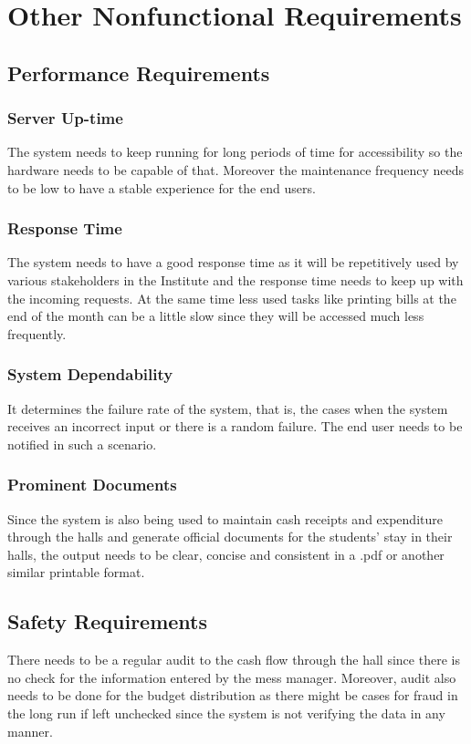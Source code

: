 \documentclass{scrreprt}
\begin{document}
\chapter{Other Nonfunctional Requirements}

\section{Performance Requirements}
\subsection{Server Up-time}
The system needs to keep running for long periods of time for accessibility so the hardware needs to be capable of that. Moreover the maintenance frequency needs to be low to have a stable experience for the end users.\subsection{Response Time}
The system needs to have a good response time as it will be repetitively used by various stakeholders in the Institute and the response time needs to keep up with the incoming requests. At the same time less used tasks like printing bills at the end of the month can be a little slow since they will be accessed much less frequently.
\subsection{System Dependability}
It determines the failure rate of the system, that is, the cases when the system receives an incorrect input or there is a random failure. The end user needs to be notified in such a scenario.
\subsection{Prominent Documents}
Since the system is also being used to maintain cash receipts and expenditure through the halls and generate official documents for the students' stay in their halls, the output needs to be clear, concise and consistent in a .pdf or another similar printable format.



\section{Safety Requirements}
There needs to be a regular audit to the cash flow through the hall since there is no check for the information entered by the mess manager. Moreover, audit also needs to be done for the budget distribution as there might be cases for fraud in the long run if left unchecked since the system is not verifying the data in any manner.
\end{document}
